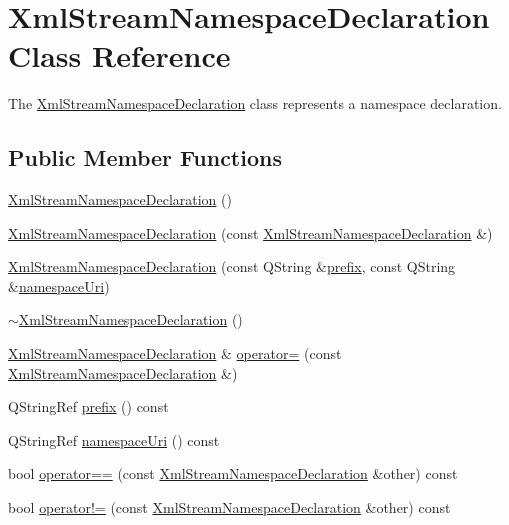 \hypertarget{class_xml_stream_namespace_declaration}{}\section{Xml\+Stream\+Namespace\+Declaration Class Reference}
\label{class_xml_stream_namespace_declaration}


The \hyperlink{class_xml_stream_namespace_declaration}{Xml\+Stream\+Namespace\+Declaration} class represents a namespace declaration.  


\subsection*{Public Member Functions}
\begin{DoxyCompactItemize}
\item 
\hyperlink{class_xml_stream_namespace_declaration_a7d6716e210ce5ee3dea6ed914117368d}{Xml\+Stream\+Namespace\+Declaration} ()
\item 
\hyperlink{class_xml_stream_namespace_declaration_a438efeeca364b3003ef2ef16d45d9d22}{Xml\+Stream\+Namespace\+Declaration} (const \hyperlink{class_xml_stream_namespace_declaration}{Xml\+Stream\+Namespace\+Declaration} \&)
\item 
\hyperlink{class_xml_stream_namespace_declaration_af7284ccda394915ac5a1a8bd2c80c064}{Xml\+Stream\+Namespace\+Declaration} (const Q\+String \&\hyperlink{class_xml_stream_namespace_declaration_a84440d3a55f8679da78032e02a49ccbd}{prefix}, const Q\+String \&\hyperlink{class_xml_stream_namespace_declaration_ac2d6510eeacc33073402389403e2c3ef}{namespace\+Uri})
\item 
\hyperlink{class_xml_stream_namespace_declaration_a682a9243d890610af2b680b8feb2145e}{$\sim$\+Xml\+Stream\+Namespace\+Declaration} ()
\item 
\hyperlink{class_xml_stream_namespace_declaration}{Xml\+Stream\+Namespace\+Declaration} \& \hyperlink{class_xml_stream_namespace_declaration_a554efdcdfc87142180db128f9c8c0ed7}{operator=} (const \hyperlink{class_xml_stream_namespace_declaration}{Xml\+Stream\+Namespace\+Declaration} \&)
\item 
Q\+String\+Ref \hyperlink{class_xml_stream_namespace_declaration_a84440d3a55f8679da78032e02a49ccbd}{prefix} () const
\item 
Q\+String\+Ref \hyperlink{class_xml_stream_namespace_declaration_ac2d6510eeacc33073402389403e2c3ef}{namespace\+Uri} () const
\item 
bool \hyperlink{class_xml_stream_namespace_declaration_acdd97a34672a888cd8bf2dc29b87b66e}{operator==} (const \hyperlink{class_xml_stream_namespace_declaration}{Xml\+Stream\+Namespace\+Declaration} \&other) const
\item 
bool \hyperlink{class_xml_stream_namespace_declaration_a44ed88502e624652408d781118835295}{operator!=} (const \hyperlink{class_xml_stream_namespace_declaration}{Xml\+Stream\+Namespace\+Declaration} \&other) const
\end{DoxyCompactItemize}
